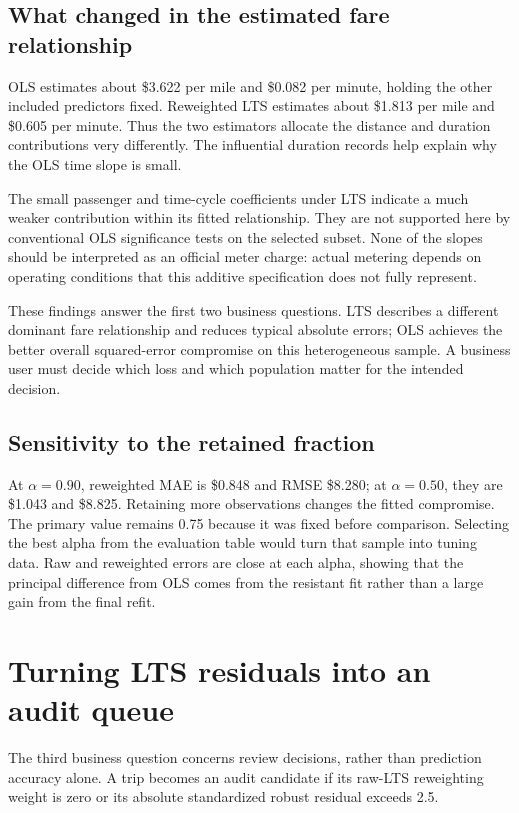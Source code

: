 \documentclass[11pt,letterpaper]{article}
\newcommand{\resulttable}[2]{\begin{table}[H]\centering\small\caption{#2}\end{table}}
\begin{document}
\subsection{What changed in the estimated fare relationship}
\resulttable{coefficients}{Original-unit coefficients for the clean primary fits.}
OLS estimates about \$3.622 per mile and \$0.082 per minute, holding the other included predictors fixed. Reweighted LTS estimates about \$1.813 per mile and \$0.605 per minute. Thus the two estimators allocate the distance and duration contributions very differently. The influential duration records help explain why the OLS time slope is small.

The small passenger and time-cycle coefficients under LTS indicate a much weaker contribution within its fitted relationship. They are not supported here by conventional OLS significance tests on the selected subset. None of the slopes should be interpreted as an official meter charge: actual metering depends on operating conditions that this additive specification does not fully represent.

These findings answer the first two business questions. LTS describes a different dominant fare relationship and reduces typical absolute errors; OLS achieves the better overall squared-error compromise on this heterogeneous sample. A business user must decide which loss and which population matter for the intended decision.

\subsection{Sensitivity to the retained fraction}
\resulttable{sensitivity}{Evaluation results for all prespecified LTS settings.}
At $\alpha=0.90$, reweighted MAE is \$0.848 and RMSE \$8.280; at $\alpha=0.50$, they are \$1.043 and \$8.825. Retaining more observations changes the fitted compromise. The primary value remains 0.75 because it was fixed before comparison. Selecting the best alpha from the evaluation table would turn that sample into tuning data. Raw and reweighted errors are close at each alpha, showing that the principal difference from OLS comes from the resistant fit rather than a large gain from the final refit.

\section{Turning LTS residuals into an audit queue}
The third business question concerns review decisions, rather than prediction accuracy alone. A trip becomes an audit candidate if its raw-LTS reweighting weight is zero or its absolute standardized robust residual exceeds 2.5.
\end{document}
